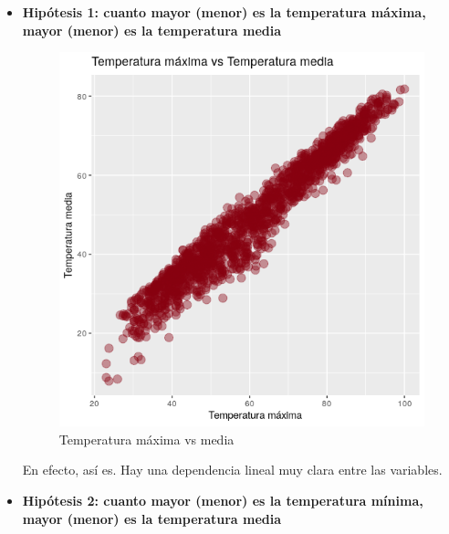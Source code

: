 \begin{itemize}
	\item \textbf{Hipótesis 1: cuanto mayor (menor) es la temperatura máxima, mayor (menor) es la temperatura media}
	
	\begin{figure}[H] %
		\centering
		\includegraphics[scale=0.5]{hip1.png}  %
		\caption{Temperatura máxima vs media} 
		\label{fig:hip1}
	\end{figure}

En efecto, así es. Hay una dependencia lineal muy clara entre las variables.

	 \item \textbf{Hipótesis 2: cuanto mayor (menor) es la temperatura mínima, mayor (menor) es la temperatura media}
	 

\end{itemize}

